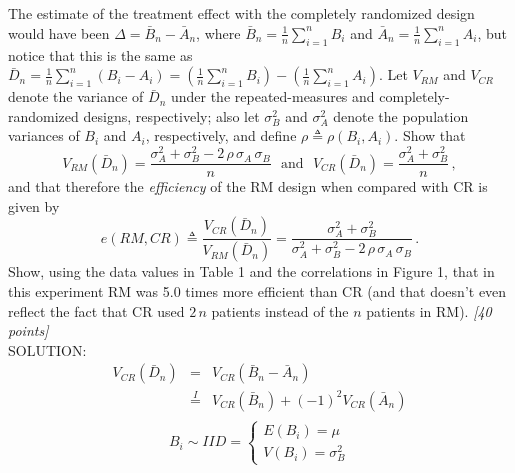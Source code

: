 \documentclass[12pt]{article}
\begin{document}
\begin{itemize}
\begin{itemize}
The estimate of the treatment effect with the completely randomized design would have been $\hat{ \Delta } = \bar{ B }_n - \bar{ A }_n$, where $\bar{ B }_n = \frac{ 1 }{ n } \sum_{ i = 1 }^n B_i$ and $\bar{ A }_n = \frac{ 1 }{ n } \sum_{ i = 1 }^n A_i$, but notice that this is the same as $\bar{ D }_n = \frac{ 1 }{ n } \sum_{ i = 1 }^n ( B_i - A_i ) = \left( \frac{ 1 }{ n } \sum_{ i = 1 }^n B_i \right) - \left( \frac{ 1 }{ n } \sum_{ i = 1 }^n A_i \right)$. Let $V_{ RM }$ \vspace*{0.05in} and $V_{ CR }$ denote the variance of $\bar{ D }_n$ under the repeated-measures and completely-randomized designs, respectively; also let $\sigma_B^2$ and $\sigma_A^2$ denote the population variances of $B_i$ and $A_i$, respectively, and define $\rho \triangleq \rho ( B_i, A_i )$. Show that
\begin{equation} \label{bp-1}
V_{ RM } \left( \bar{ D }_n \right) = \frac{ \sigma_A^2 + \sigma_B^2 - 2 \, \rho \, \sigma_A \, \sigma_B }{ n } \ \ \ \text{and} \ \ \ V_{ CR } \left( \bar{ D }_n \right) = \frac{ \sigma_A^2 + \sigma_B^2 }{ n } \, ,
\end{equation} 
and that therefore the \textit{efficiency} of the RM design when compared with CR is given by
\begin{equation} \label{bp-2}
e ( RM, CR ) \triangleq \frac{ V_{ CR } \left( \bar{ D }_n \right) }{ V_{ RM } \left( \bar{ D }_n \right) } = \frac{ \sigma_A^2 + \sigma_B^2 }{ \sigma_A^2 + \sigma_B^2 - 2 \, \rho \, \sigma_A \, \sigma_B } \, .
\end{equation} 
Show, using the data values in Table 1 and the correlations in Figure 1, that in this experiment RM was 5.0 times more efficient than CR (and that doesn't even reflect the fact that CR used $2 \, n$ patients instead of the $n$ patients in RM). \textit{[40 points]} \\

SOLUTION: \\
\begin{eqnarray} 
V_{CR} (\bar D_n) & = & V_{CR}(\bar B_n - \bar A_n) \nonumber \\
& \stackrel{I}{=} & V_{CR} (\bar B_n) + (-1)^2 V_{CR}(\bar A_n) \nonumber \\ \nonumber
\end{eqnarray}
$$
B_i \sim IID = \left\{
        \begin{array}{ll}
           E(B_i) = \mu \\
      	   V(B_i) = \sigma_B^2 
        \end{array}
    \right.
$$


\end{itemize}
\end{itemize}
\end{document}
